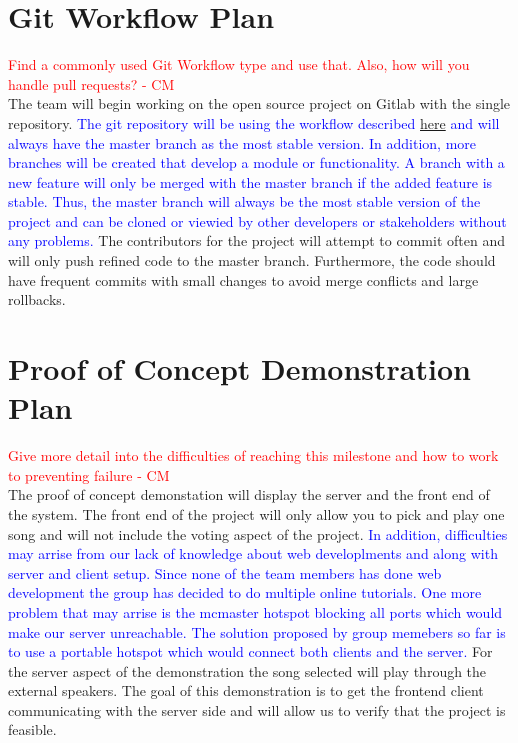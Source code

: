 \documentclass{article}
\begin{document}
\section{Git Workflow Plan}
\textcolor{red}{Find a commonly used Git Workflow type and use that. Also, how will you handle pull requests?  - CM} \\
The team will begin working on the open source project on Gitlab with the single repository. 
\textcolor{blue}{
The git repository will be using the workflow described \href{https://git-scm.com/book/en/v2/Git-Branching-Branching-Workflows}{here} and will always have the master branch as the most stable version. In addition, more branches will be created that develop a module or functionality. A branch with a new feature will only be merged with the master branch if the added feature is stable. Thus, the master branch will always be the most stable version of the project and can be cloned or viewied by other developers or stakeholders without any problems. } The contributors for the project will attempt to commit often and will only push refined code to the master branch. Furthermore, the code should have frequent commits with small changes to avoid merge conflicts and large rollbacks.
\section{Proof of Concept Demonstration Plan}
\textcolor{red}{Give more detail into the difficulties of reaching this milestone and how to work to preventing failure  - CM} \\
The proof of concept demonstation will display the server and the front end of the system. The front end of the project will only allow you to pick and play one song and will not include the voting aspect of the project.\textcolor{blue}{ In addition, difficulties may arrise from our lack of knowledge about web developlments and along with server and client setup. Since none of the team members has done web development the group has decided to do multiple online tutorials. One more problem that may arrise is the mcmaster hotspot blocking all ports which would make our server unreachable. The solution proposed by group memebers so far is to use a portable hotspot which would connect both clients and the server.} For the server aspect of the demonstration the song selected will play through the external speakers. The goal of this demonstration is to get the frontend client communicating with the server side and will allow us to verify that the project is feasible.
\end{document}
